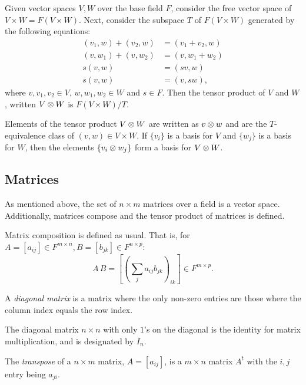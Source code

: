 \begin{definition}\label{def:tensor_product_of_vector_spaces}
  Given vector spaces $V, W$ over the base field $F$, consider the free vector space of $V
  \times W = F(V\times W)$. Next, consider the subspace $T$ of $F(V\times W)$ generated by the
  following equations:
  \begin{align*}
    (v_1,w)+(v_2,w) & = (v_1+v_2,w)\\
    (v,w_1)+(v,w_2) & = (v, w_1+w_2)\\
    s(v,w) &= (s v,w)\\
    s(v,w) &= (v,s w),
  \end{align*}
  where $v,v_1,v_2 \in V$, $w,w_1,w_2 \in W$ and $s\in F$. Then the tensor product of
  $V$ and $W$, written $V\otimes W$ is $F(V\times W)/T$.
\end{definition}

Elements of the tensor product $V\otimes W$ are written as $v\otimes w$ and are the $T$-equivalence class of
$(v,w) \in V\times W$. If $\{v_i\}$ is a basis for $V$ and $\{w_j\}$ is a basis for $W$, then the
elements $\{v_i\otimes w_j\}$ form a basis for $V\otimes W$.
\subsection{Matrices} %
\label{sub:matrices}


As mentioned above, the set of $n\times m$ matrices over a field is a vector space. Additionally,
matrices compose and the tensor product of matrices is defined.

Matrix composition is defined as usual. That is, for $A = [a_{i j}] \in F^{m\times n}, B =
[b_{j k}]\in F^{n \times p}$:
  \[
    A \, B = \left[\left(\sum_{j}a_{i j}b_{j k}\right)_{i k}\right] \in F^{m \times p}.
  \]



\begin{definition}\label{def:diagonal_matrix}
  A \emph{diagonal matrix} is a matrix where the only non-zero entries are those where the column
  index equals the row index.
\end{definition}

The diagonal matrix $n\times n$ with only $1$'s on the diagonal is the identity for matrix
multiplication, and is designated by $I_n$.

\begin{definition}\label{def:transpose}
  The \emph{transpose} of a $n\times m$ matrix, $A=[a_{i j}]$, is a $m\times n$ matrix $A^{t}$ with
  the $i,j$ entry being $a_{j i}$.
\end{definition}

